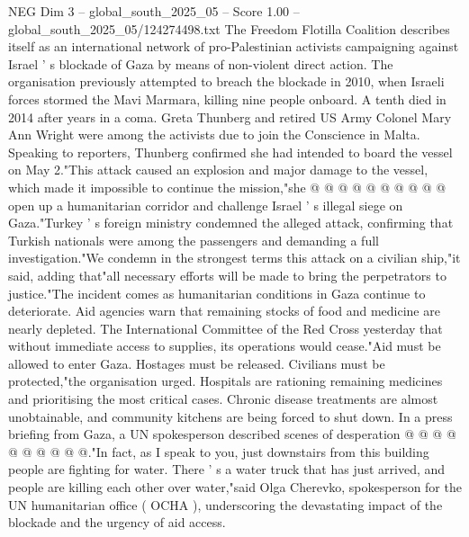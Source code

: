 \begin{textsample}{NEG Dim 3 – global\_south\_2025\_05 – Score 1.00 – global\_south\_2025\_05/124274498.txt}
The Freedom Flotilla Coalition describes itself as an international network of pro-Palestinian activists campaigning against Israel ' s blockade of Gaza by means of non-violent direct action.
The organisation previously attempted to breach the blockade in 2010, when Israeli forces stormed the Mavi Marmara, killing nine people onboard.
A tenth died in 2014 after years in a coma.
Greta Thunberg and retired US Army Colonel Mary Ann Wright were among the activists due to join the Conscience in Malta.
Speaking to reporters, Thunberg confirmed she had intended to board the vessel on May 2."This attack caused an explosion and major damage to the vessel, which made it impossible to continue the mission,"she @ @ @ @ @ @ @ @ @ @ open up a humanitarian corridor and challenge Israel ' s illegal siege on Gaza."Turkey ' s foreign ministry condemned the alleged attack, confirming that Turkish nationals were among the passengers and demanding a full investigation."We condemn in the strongest terms this attack on a civilian ship,"it said, adding that"all necessary efforts will be made to bring the perpetrators to justice."The incident comes as humanitarian conditions in Gaza continue to deteriorate.
Aid agencies warn that remaining stocks of food and medicine are nearly depleted.
The International Committee of the Red Cross yesterday that without immediate access to supplies, its operations would cease."Aid must be allowed to enter Gaza.
Hostages must be released.
Civilians must be protected,"the organisation urged.
Hospitals are rationing remaining medicines and prioritising the most critical cases.
Chronic disease treatments are almost unobtainable, and community kitchens are being forced to shut down.
In a press briefing from Gaza, a UN spokesperson described scenes of desperation @ @ @ @ @ @ @ @ @ @."In fact, as I speak to you, just downstairs from this building people are fighting for water.
There ' s a water truck that has just arrived, and people are killing each other over water,"said Olga Cherevko, spokesperson for the UN humanitarian office ( OCHA ), underscoring the devastating impact of the blockade and the urgency of aid access.

\end{textsample}
